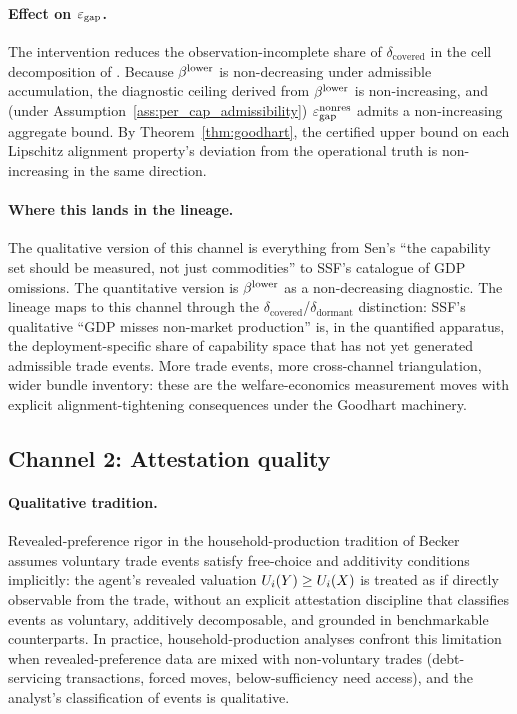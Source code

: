 \paragraph{Effect on $\varepsilon_{\mathrm{gap}}$.}
The intervention reduces the observation-incomplete share of
$\delta_{\mathrm{covered}}$ in the cell decomposition of
\citep[Definition~8]{lasser2026paper8b}.  Because $\beta^{\mathrm{lower}}$ is
non-decreasing under admissible accumulation, the diagnostic
ceiling derived from $\beta^{\mathrm{lower}}$ is non-increasing, and (under
Assumption~\ref{ass:per_cap_admissibility}) $\varepsilon_{\mathrm{gap}}^{\mathrm{nonres}}$
admits a non-increasing aggregate bound.  By
Theorem~\ref{thm:goodhart}, the certified upper bound on each
Lipschitz alignment property's deviation from the operational
truth is non-increasing in the same direction.

\paragraph{Where this lands in the lineage.}
The qualitative version of this channel is everything from Sen's
``the capability set should be measured, not just commodities'' to
SSF's catalogue of GDP omissions.  The quantitative version is
$\beta^{\mathrm{lower}}$ as a non-decreasing diagnostic.  The lineage maps to this
channel through the $\delta_{\mathrm{covered}}$/$\delta_{\mathrm{dormant}}$
distinction: SSF's qualitative ``GDP misses non-market production''
is, in the quantified apparatus, the deployment-specific share of
capability space that has not yet generated admissible trade
events.  More trade events, more cross-channel triangulation, wider
bundle inventory: these are the welfare-economics measurement
moves with explicit alignment-tightening consequences under the
Goodhart machinery.

\subsection{Channel 2: Attestation quality}
\label{sec:channel_attestation}

\paragraph{Qualitative tradition.}
Revealed-preference rigor in the household-production tradition of
Becker~\citep{becker1965theory,becker1981treatise} assumes
voluntary trade events satisfy free-choice and additivity
conditions implicitly: the agent's revealed valuation $U_i(Y) \geq
U_i(X)$ is treated as if directly observable from the trade,
without an explicit attestation discipline that classifies events
as voluntary, additively decomposable, and grounded in
benchmarkable counterparts.  In practice, household-production
analyses confront this limitation when revealed-preference data
are mixed with non-voluntary trades (debt-servicing transactions,
forced moves, below-sufficiency need access), and the analyst's
classification of events is qualitative.

